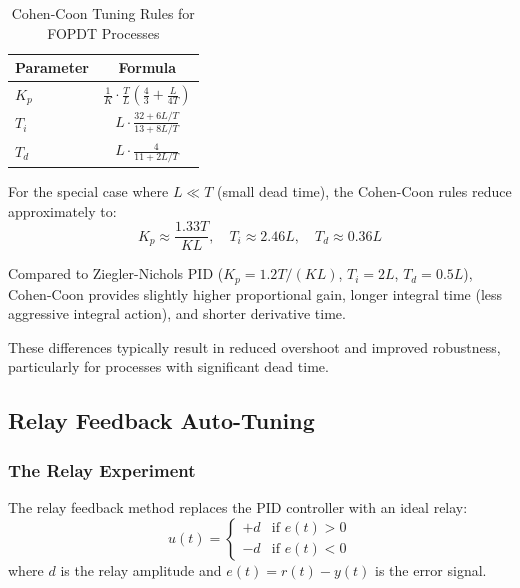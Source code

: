 \begin{table}[htbp]
\centering
\caption{Cohen-Coon Tuning Rules for FOPDT Processes}
\label{tab:cohen_coon}
\begin{tabular}{lc}
\toprule
\textbf{Parameter} & \textbf{Formula} \\
\midrule
$K_p$ & $\displaystyle\frac{1}{K}\cdot\frac{T}{L}\left(\frac{4}{3} + \frac{L}{4T}\right)$ \\[2ex]
$T_i$ & $\displaystyle L\cdot\frac{32 + 6L/T}{13 + 8L/T}$ \\[2ex]
$T_d$ & $\displaystyle L\cdot\frac{4}{11 + 2L/T}$ \\
\bottomrule
\end{tabular}
\end{table}

For the special case where $L \ll T$ (small dead time), the Cohen-Coon rules reduce approximately to:
\begin{equation}
    K_p \approx \frac{1.33T}{KL}, \quad T_i \approx 2.46L, \quad T_d \approx 0.36L
\end{equation}

Compared to Ziegler-Nichols PID ($K_p = 1.2T/(KL)$, $T_i = 2L$, $T_d = 0.5L$), Cohen-Coon provides slightly higher proportional gain, longer integral time (less aggressive integral action), and shorter derivative time.

These differences typically result in reduced overshoot and improved robustness, particularly for processes with significant dead time.

\subsection{Relay Feedback Auto-Tuning}

\subsubsection{The Relay Experiment}

The relay feedback method replaces the PID controller with an ideal relay:
\begin{equation}
    u(t) = \begin{cases}
        +d & \text{if } e(t) > 0 \\
        -d & \text{if } e(t) < 0
    \end{cases}
\end{equation}
where $d$ is the relay amplitude and $e(t) = r(t) - y(t)$ is the error signal.


